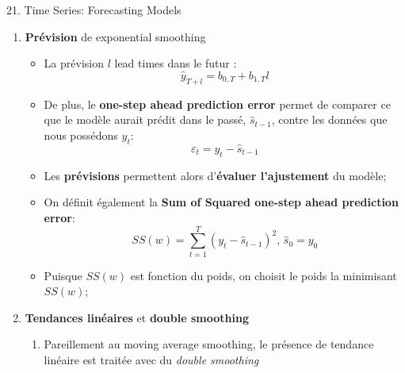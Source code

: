 \documentclass[12pt, titlepage, french]{report}
\begin{document}
\begin{CHPT_SUMM}[label = {timeseries21}]{21. Time Series: Forecasting Models}
\begin{enumerate}
\begin{itemize}
		\item	On peut réécrire l'expression de façon récursive :
			\begin{equation*}
			\hat{s}_{t}
				=	w \hat{s}_{t - 1} + (1 - w) y_{t}
			\end{equation*}
		\item	Le poids (weight), ou \textbf{smoothing factor}, est \textbf{contenu entre 0 et 1} et représente \textbf{la vitesse} à laquelle le poids de l'observation précédente va \textbf{décroître};
		\item[]	Alors, le plus faible $w$, le plus \textit{smooth} la série
		\item[]	Pour concrétiser, en un exemple de différentes poids:
		
		\texttt{[image: src/exponential-smoothing-example.png]}
		\end{itemize}
%		
	\item[]	\textbf{Prévision} de exponential smoothing
		\begin{itemize}
		\item	La prévision $l$ lead times dans le futur :
			\begin{equation*}
			\hat{y}_{T + l}
				=	b_{0, T} + b_{1, T} l
			\end{equation*}
		\item	De plus, le \textbf{one-step ahead prediction error} permet de comparer ce que le modèle aurait prédit dans le passé, $\hat{s}_{t - 1}$, contre les données que nous possédons $y_{t}$:
			\begin{equation*}
			\varepsilon_{t}
				=	y_{t} - \hat{s}_{t - 1}	
			\end{equation*}		
		\item[]	Les \textbf{prévisions} permettent alors d'\textbf{évaluer l'ajustement} du modèle;
		\item	On définit également la \textbf{Sum of Squared one-step ahead prediction error}:
			\begin{equation*}
			SS(w)
				=	\sum_{t = 1}^{T}(y_{t} - \hat{s}_{t - 1})^{2}, \, \hat{s}_{0} = y_{0}
			\end{equation*}
		\item[]	Puisque $SS(w)$ est fonction du poids, on choisit le poids la minimisant $SS(w)$;
		\end{itemize}	
%		
	\item[]	\textbf{Tendances linéaires} et \textbf{double smoothing}
		\begin{enumerate}
		\item[]	Pareillement au moving average smoothing, le présence de tendance linéaire est traitée avec du \textit{double smoothing}

\end{enumerate}
\end{enumerate}
\end{CHPT_SUMM}
\end{document}
